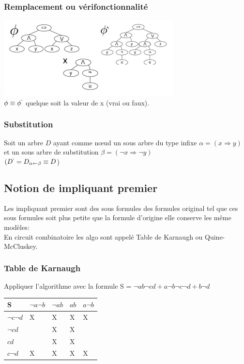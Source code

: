 \subsubsection{Remplacement ou vérifonctionnalité}
\includegraphics[scale=0.8]{img/of-remplacement.png} \\

$\phi \equiv \phi^{`}$ quelque soit la valeur de x (vrai ou faux).

\subsubsection{Substitution}
Soit un arbre $D$ ayant comme nœud un sous arbre du type infixe $\alpha = (x \Rightarrow y)$ et un sous arbre de substitution $\beta = (\neg x \Rightarrow \neg y)$\\
$(D^{`} = D_{\alpha \leftarrow \beta} \equiv D$)\\

\subsection{Notion de impliquant premier }
Les impliquant premier sont des sous formules des formules original tel que ces sous formules soit plus petite que la formule d'origine elle conserve les même modèles:\\
En circuit combinatoire les algo sont appelé  Table de Karnaugh ou Quine-McCluskey.

\subsubsection{Table de Karnaugh}
Appliquer l'algorithme avec la formule S = $\neg a b \neg c d + a \neg b \neg c \neg d + b \neg d$\\

\begin{tabular}{l|l|l|l|l}
  \hline
  S & $\neg a \neg b$ & $\neg a b$ & $ab$ & $a \neg b$\\
  \hline
  $\neg c \neg d$ & X & X & X & X \\
  $ \neg c d $ & $ $ & X & X & $ $ \\
  $cd$ & $ $ & X & X & $ $ \\
  $c \neg d$ & X & X & X & X \\
  \hline
\end{tabular}\\

